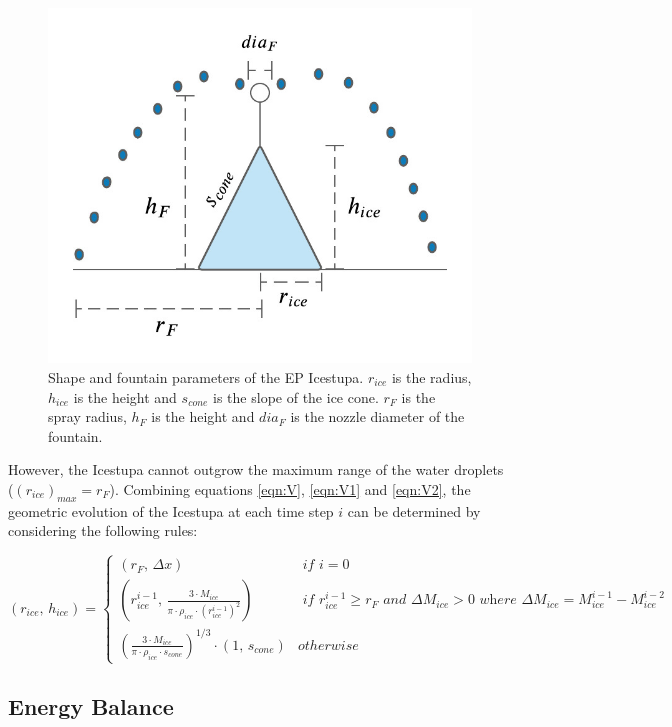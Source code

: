 \documentclass[utf8]{frontiersSCNS} %
\begin{document}
  \begin{figure} \begin{center} \includegraphics[width=10 cm]{Figures/Figure_5.jpg} \end{center} \caption{Shape and
fountain parameters of the EP Icestupa. $r_{ice}$ is the radius, $h_{ice}$ is the height and $s_{cone}$ is the
slope of the ice cone. $r_F$ is the spray radius, $h_F$ is the height and $dia_F$ is the nozzle diameter of the
fountain.} \label{fig:shape} \end{figure}
  
However, the Icestupa cannot outgrow the maximum range of the water droplets ($(r_{ice})_{max} = r_{F}$). Combining
equations \ref{eqn:V}, \ref{eqn:V1} and \ref{eqn:V2}, the geometric evolution of the Icestupa at each time step $i$
can be determined by considering the following rules:

\begin{equation} (r_{ice},\, h_{ice}) = \left\{ \begin{array}{ll} (r_F ,\, \Delta x) & \textit{ if } i=0\\
    (r_{ice}^{i-1},\, \frac{3 \cdot M_{ice}}{\pi \cdot \rho_{ice} \cdot {(r_{ice}^{i-1})}^2}) & \textit{ if }
    r_{ice}^{i-1} \geq r_{F} \textit{ and } \Delta M_{ice} > 0 \textit{ where } \Delta M_{ice} = M_{ice}^{i-1} -
    M_{ice}^{i-2}\\ (\frac{3 \cdot M_{ice}}{\pi \cdot \rho_{ice} \cdot s_{cone}})^{1/3} \cdot (1,\,  s_{cone}) &
otherwise \end{array} \right.  \label{eqn:A2} \end{equation}

\subsection{Energy Balance} \label{section:EB}
\end{document}
